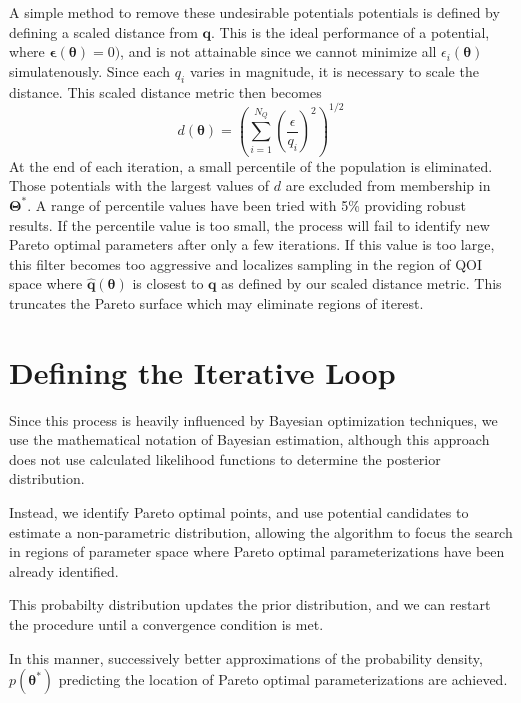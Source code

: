 	A simple method to remove these undesirable potentials potentials is defined by defining a scaled distance from $\bm{q}$.  This is the ideal performance of a potential, where $\bm{\epsilon}(\bm{\theta})=0)$, and is not attainable since we cannot minimize all $\epsilon_i(\bm{\theta})$ simulatenously.  Since each $q_i$ varies in magnitude, it is necessary to scale the distance.  This scaled distance metric then becomes
	\begin{equation}
		d(\bm{\theta}) = \left(\sum_{i=1}^{N_Q} \left(\frac{\epsilon}{q_i}\right)^2\right)^{1/2}
	\end{equation}
	At the end of each iteration, a small percentile of the population is eliminated.  Those potentials with the largest values of $d$ are excluded from membership in $\bm{\Theta}^*$.  A range of percentile values have been tried with 5\% providing robust results.  If the percentile value is too small, the process will fail to identify new Pareto optimal parameters after only a few iterations.  If this value is too large, this filter becomes too aggressive and localizes sampling in the region of QOI space where $\hat{\bm{q}}(\bm{\theta})$ is closest to $\bm{q}$ as defined by our scaled distance metric.  This truncates the Pareto surface which may eliminate regions of iterest.

\section{Defining the Iterative Loop}
\label{sec:iterative_loop}
Since this process is heavily influenced by Bayesian optimization techniques, we use the mathematical notation of Bayesian estimation, although this approach does not use calculated likelihood functions to determine the posterior distribution.

Instead, we identify Pareto optimal points, and use potential candidates to estimate a non-parametric distribution, allowing the algorithm to focus the search in regions of parameter space where Pareto optimal parameterizations have been already identified.

This probabilty distribution updates the prior distribution, and we can restart the procedure until a convergence condition is met.

In this manner, successively better approximations of the probability density, $p(\bm{\theta}^*)$ predicting the location of Pareto optimal parameterizations are achieved.
